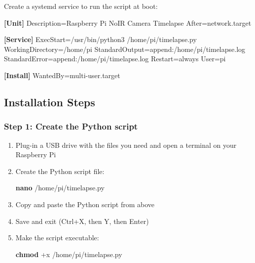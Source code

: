 \documentclass[
]{article}
\newenvironment{Shaded}{\begin{snugshade}}{\end{snugshade}}
\newcommand{\DataTypeTok}[1]{\textcolor[rgb]{0.13,0.29,0.53}{#1}}
\newcommand{\FunctionTok}[1]{\textcolor[rgb]{0.13,0.29,0.53}{\textbf{#1}}}
\newcommand{\KeywordTok}[1]{\textcolor[rgb]{0.13,0.29,0.53}{\textbf{#1}}}
\newcommand{\NormalTok}[1]{#1}
\newcommand{\OtherTok}[1]{\textcolor[rgb]{0.56,0.35,0.01}{#1}}
\newcommand{\StringTok}[1]{\textcolor[rgb]{0.31,0.60,0.02}{#1}}
\begin{document}
Create a systemd service to run the script at boot:

\begin{Shaded}
\begin{Highlighting}[]
\KeywordTok{[Unit]}
\DataTypeTok{Description}\OtherTok{=}\StringTok{Raspberry Pi NoIR Camera Timelapse}
\DataTypeTok{After}\OtherTok{=}\StringTok{network.target}

\KeywordTok{[Service]}
\DataTypeTok{ExecStart}\OtherTok{=}\StringTok{/usr/bin/python3 /home/pi/timelapse.py}
\DataTypeTok{WorkingDirectory}\OtherTok{=}\StringTok{/home/pi}
\DataTypeTok{StandardOutput}\OtherTok{=}\StringTok{append:/home/pi/timelapse.log}
\DataTypeTok{StandardError}\OtherTok{=}\StringTok{append:/home/pi/timelapse.log}
\DataTypeTok{Restart}\OtherTok{=}\StringTok{always}
\DataTypeTok{User}\OtherTok{=}\StringTok{pi}

\KeywordTok{[Install]}
\DataTypeTok{WantedBy}\OtherTok{=}\StringTok{multi{-}user.target}
\end{Highlighting}
\end{Shaded}

\subsection{Installation Steps}\label{installation-steps}

\subsubsection{Step 1: Create the Python
script}\label{step-1-create-the-python-script}

\begin{enumerate}
\def\labelenumi{\arabic{enumi}.}
\item
  Plug-in a USB drive with the files you need and open a terminal on
  your Raspberry Pi
\item
  Create the Python script file:

\begin{Shaded}
\begin{Highlighting}[]
\FunctionTok{nano}\NormalTok{ /home/pi/timelapse.py}
\end{Highlighting}
\end{Shaded}
\item
  Copy and paste the Python script from above
\item
  Save and exit (Ctrl+X, then Y, then Enter)
\item
  Make the script executable:

\begin{Shaded}
\begin{Highlighting}[]
\FunctionTok{chmod}\NormalTok{ +x /home/pi/timelapse.py}
\end{Highlighting}
\end{Shaded}
\end{enumerate}
\end{document}
